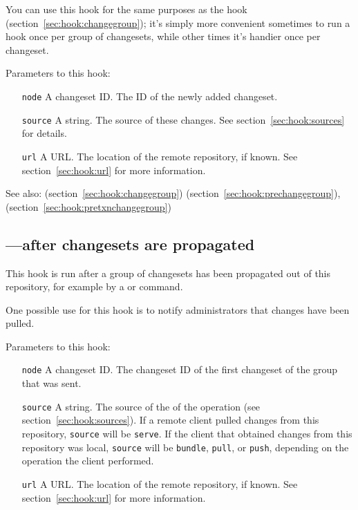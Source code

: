 You can use this hook for the same purposes as the 
hook (section~\ref{sec:hook:changegroup}); it's simply more convenient
sometimes to run a hook once per group of changesets, while other
times it's handier once per changeset.

Parameters to this hook:
\begin{itemize}
\item[\texttt{node}] A changeset ID.  The ID of the newly added
  changeset.
\item[\texttt{source}] A string.  The source of these changes.  See
  section~\ref{sec:hook:sources} for details.
\item[\texttt{url}] A URL.  The location of the remote repository, if
  known.  See section~\ref{sec:hook:url} for more information.
\end{itemize}

See also:  (section~\ref{sec:hook:changegroup})  (section~\ref{sec:hook:prechangegroup}),  (section~\ref{sec:hook:pretxnchangegroup})

\subsection{---after changesets are propagated}
\label{sec:hook:outgoing}

This hook is run after a group of changesets has been propagated out
of this repository, for example by a  or 
command.

One possible use for this hook is to notify administrators that
changes have been pulled.

Parameters to this hook:
\begin{itemize}
\item[\texttt{node}] A changeset ID.  The changeset ID of the first
  changeset of the group that was sent.
\item[\texttt{source}] A string.  The source of the of the operation
  (see section~\ref{sec:hook:sources}).  If a remote client pulled
  changes from this repository, \texttt{source} will be
  \texttt{serve}.  If the client that obtained changes from this
  repository was local, \texttt{source} will be \texttt{bundle},
  \texttt{pull}, or \texttt{push}, depending on the operation the
  client performed.
\item[\texttt{url}] A URL.  The location of the remote repository, if
  known.  See section~\ref{sec:hook:url} for more information.
\end{itemize}

